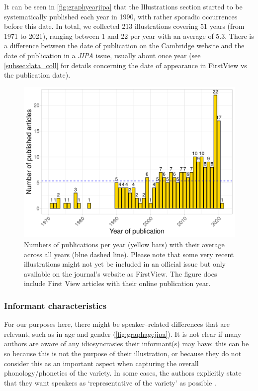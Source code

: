 It can be seen in \autoref{fig:graphyearjipa} that the Illustrations section started to be systematically published each year in 1990, with rather sporadic occurrences before this date. In total, we collected 213 illustrations covering 51 years (from 1971 to 2021), ranging between 1 and 22 per year with an average of 5.3. There is a difference between the date of publication on the Cambridge website and the date of publication in a \textit{JIPA} issue, usually about once year (see \autoref{subsec:data_coll} for details concerning the date of appearance in FirstView vs the publication date).

\begin{figure}
	\centering
	\includegraphics[width=1\linewidth]{jipa/images/graph_year_JIPA}
	\caption[Numbers of \textit{Illustrations of the IPA} publications per year]{Numbers of publications per year (yellow bars) with their average across all years (blue dashed line). Please note that some very recent illustrations might not yet be included in an official issue but only available on the journal’s website as FirstView. The figure does include First View articles with their online publication year.}
	\label{fig:graphyearjipa}
\end{figure}

\subsubsection{Informant characteristics}

For our purposes here, there might be speaker–related differences that are relevant, such as in age and gender (\autoref{fig:graphagejipa}). It is not clear if many authors are aware of any idiosyncrasies their informant(s) may have: this can be so because this is not the purpose of their illustration, or because they do not consider this as an important aspect when capturing the overall phonology/phonetics of the variety. In some cases, the authors explicitly state that they want speakers as ‘representative of the variety’ as possible \parencite[109]{namboodiripadMalayalamNamboodiriDialect2017a}.\\

